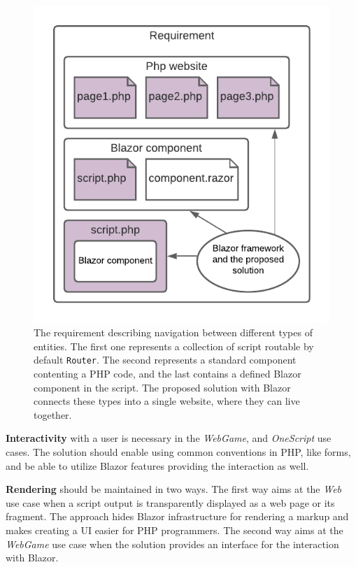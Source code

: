 \begin{figure}[t]\centering
\includegraphics{./img/Requirement}
\caption{The requirement describing navigation between different types of entities. 
The first one represents a collection of script routable by default \texttt{Router}.
The second represents a standard component contenting a PHP code, and the last contains a defined Blazor component in the script.
The proposed solution with Blazor connects these types into a single website, where they can live together.
}
\label{img10:scripts}
\end{figure} 
\par
\textbf{Interactivity} with a user is necessary in the \textit{WebGame}, and \textit{OneScript} use cases.
The solution should enable using common conventions in PHP, like forms, and be able to utilize Blazor features providing the interaction as well.
\par
\textbf{Rendering} should be maintained in two ways.
The first way aims at the \textit{Web} use case when a script output is transparently displayed as a web page or its fragment.
The approach hides Blazor infrastructure for rendering a markup and makes creating a UI easier for PHP programmers.
The second way aims at the \textit{WebGame} use case when the solution provides an interface for the interaction with Blazor.

